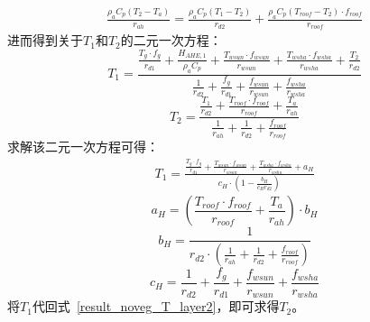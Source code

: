 %
\begin{equation}
    \begin{split}
        \frac{\rho _a C_p \left( T_{2} - T_a \right)}{r_{ah}} = 
        \frac{\rho _a C_p \left( T_{1} - T_{2} \right)}{r_{d2}} + \frac{\rho _a C_p \left( T_{roof} - T_{2} \right)\cdot f_{roof}}{r_{roof}}
    \end{split}
\end{equation}
进而得到关于$T_{1}$和$T_{2}$的二元一次方程：
\begin{equation}
         T_{1} =
         \frac{\frac{T_{g} \cdot f_{g}}{r_{d1}} + \frac{H_{AHE,1}}{\rho _a C_p} + \frac{T_{wsun} \cdot f_{wsun}}{r_{wsun}} + \frac{T_{wsha} \cdot f_{wsha}}{r_{wsha}} + \frac{T_{2}}{r_{d2}}}{\frac{1}{r_{d2}} + \frac{f_{g}}{r_{d1}} + \frac{f_{wsun}}{r_{wsun}} + \frac{f_{wsha}}{r_{wsha}}}
\end{equation}
%
\begin{equation}\label{result_noveg_T_layer2}
    T_{2} = \frac{\frac{T_{1}}{r_{d2}} + \frac{T_{roof} \cdot f_{roof}}{r_{roof}} + \frac{T_a}{r_{ah}}}{\frac{1}{r_{ah}} + \frac{1}{r_{d2}} + \frac{f_{roof}}{r_{roof}}}
\end{equation}
求解该二元一次方程可得：
\begin{equation}
    \begin{split}
         T_{1} = 
         \frac{\frac{T_{g} \cdot f_{g}}{r_{d1}} + \frac{T_{wsun} \cdot f_{wsun}}{r_{wsun}} + \frac{T_{wsha} \cdot f_{wsha}}{r_{wsha}} + a_{H}}{c_{H} \cdot \left( 1 - \frac{b_H}{c_{H} r_{d2}} \right)}
    \end{split}
\end{equation}
%
\begin{equation}
    a_{H} = \left(\frac{T_{roof} \cdot f_{roof}}{r_{roof}} + \frac{T_a}{r_{ah}}\right) \cdot b_{H}
\end{equation}
%
\begin{equation}
    b_{H} = \frac{1}{r_{d2} \cdot \left(\frac{1}{r_{ah}} + \frac{1}{r_{d2}} + \frac{f_{roof}}{r_{roof}} \right)}
\end{equation}
%
\begin{equation}
    c_{H} = \frac{1}{r_{d2}} + \frac{f_{g}}{r_{d1}} + \frac{f_{wsun}}{r_{wsun}} + \frac{f_{wsha}}{r_{wsha}}
\end{equation}
将$T_{1}$代回式~\ref{result_noveg_T_layer2}，即可求得$T_{2}$。

